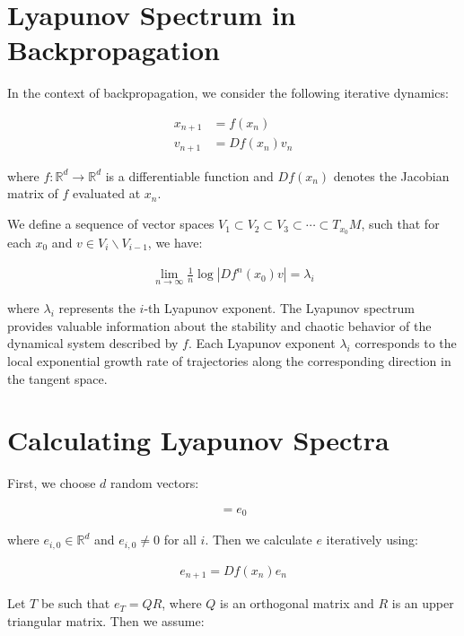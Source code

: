 \documentclass{article}
\begin{document}
\section*{Lyapunov Spectrum in Backpropagation}

In the context of backpropagation, we consider the following iterative dynamics:

\begin{align}
    x_{n+1} &= f(x_n) \\
    v_{n+1} &= Df(x_n)v_n
\end{align}

where $f: \mathbb{R}^d \rightarrow \mathbb{R}^d$ is a differentiable function and $Df(x_n)$ denotes the Jacobian matrix of $f$ evaluated at $x_n$.

We define a sequence of vector spaces $V_1 \subset V_2 \subset V_3 \subset \cdots \subset T_{x_0}M$, such that for each $x_0$ and $v \in V_i \backslash V_{i-1}$, we have:

\begin{align}
    \lim_{n \to \infty} \frac{1}{n} \log |Df^n(x_0)v| = \lambda_i
\end{align}

where $\lambda_i$ represents the $i$-th Lyapunov exponent. The Lyapunov spectrum provides valuable information about the stability and chaotic behavior of the dynamical system described by $f$. Each Lyapunov exponent $\lambda_i$ corresponds to the local exponential growth rate of trajectories along the corresponding direction in the tangent space.

\section*{Calculating Lyapunov Spectra}

First, we choose $d$ random vectors:

\begin{align}
    [e_{1,0}, e_{2,0}, \cdots, e_{d,0}] = e_0
\end{align}

where $e_{i,0} \in \mathbb{R}^d$ and $e_{i,0} \neq 0$ for all $i$. Then we calculate $e$ iteratively using:

\begin{align}
    e_{n+1} = Df(x_n)e_{n}
\end{align}

Let $T$ be such that $e_T=QR$, where $Q$ is an orthogonal matrix and $R$ is an upper triangular matrix. Then we assume:
\end{document}
